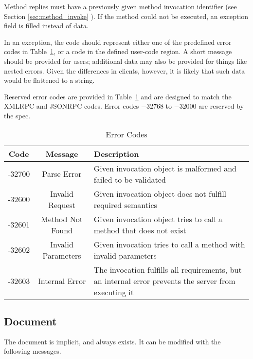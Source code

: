\documentclass[11pt, oneside]{amsart}
\begin{document}
Method replies must have a previously given method invocation identifier (see Section \ref{sec:method_invoke} ). If the method could not be executed, an exception field is filled instead of data.

In an exception, the code should represent either one of the predefined error codes in Table~\ref{tab:error_codes}, or a code in the defined user-code region. A short message should be provided for users; additional data may also be provided for things like nested errors. Given the differences in clients, however, it is likely that such data would be flattened to a string.

Reserved error codes are provided in Table~\ref{tab:error_codes} and are designed to match the XMLRPC and JSONRPC codes. Error codes $-32768$ to $-32000$ are reserved by the spec.

\begin{table}
	\begin{tabular}{ccp{3.5in}}
		\toprule
		\textbf{Code} & \textbf{Message} & \textbf{Description} \\
		\midrule
		-32700 & Parse Error & Given invocation object is malformed and failed to be validated \\
		-32600 & Invalid Request & Given invocation object does not fulfill required semantics \\
		-32601 & Method Not Found & Given invocation object tries to call a method that does not exist \\
		-32602 & Invalid Parameters & Given invocation tries to call a method with invalid parameters \\
		-32603 & Internal Error & The invocation fulfills all requirements, but an internal error prevents the server from executing it \\		
		\bottomrule
	\end{tabular}
	\caption{Error Codes}
	\label{tab:error_codes}
\end{table}

\subsection{Document}

The document is implicit, and always exists. It can be modified with the following messages.


\end{document}
